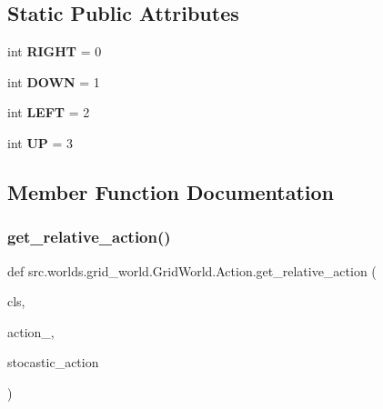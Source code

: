 \subsection*{Static Public Attributes}
\begin{DoxyCompactItemize}
\item 
\mbox{\label{classsrc_1_1worlds_1_1grid__world_1_1_grid_world_1_1_action_a9011b919b943b4d87bcbf51303ec11eb}} 
int {\bfseries R\+I\+G\+HT} = 0
\item 
\mbox{\label{classsrc_1_1worlds_1_1grid__world_1_1_grid_world_1_1_action_ae68d4343a84d373a69b136850e1cac31}} 
int {\bfseries D\+O\+WN} = 1
\item 
\mbox{\label{classsrc_1_1worlds_1_1grid__world_1_1_grid_world_1_1_action_a7b97fb22b60c57560edda782c6633c23}} 
int {\bfseries L\+E\+FT} = 2
\item 
\mbox{\label{classsrc_1_1worlds_1_1grid__world_1_1_grid_world_1_1_action_af13d2bac9d82bd37c5a154240cac10a9}} 
int {\bfseries UP} = 3
\end{DoxyCompactItemize}


\subsection{Member Function Documentation}
\mbox{\label{classsrc_1_1worlds_1_1grid__world_1_1_grid_world_1_1_action_a7048c38e1cf8960c605f01d34d7bfcf5}} 
\subsubsection{\texorpdfstring{get\+\_\+relative\+\_\+action()}{get\_relative\_action()}}
{\footnotesize\ttfamily def src.\+worlds.\+grid\+\_\+world.\+Grid\+World.\+Action.\+get\+\_\+relative\+\_\+action (\begin{DoxyParamCaption}\item[{}]{cls,  }\item[{}]{action\+\_\+,  }\item[{}]{stocastic\+\_\+action }\end{DoxyParamCaption})}


